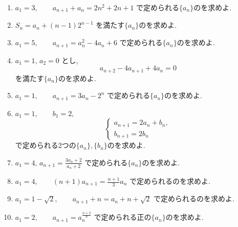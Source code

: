 \begin{enumerate}[label=\textbf{問\arabic*.},leftmargin=3.8em,format=\bookitemlink{practice-basic}{problem}{answer}]
          \item $\displaystyle a_1=3,\qquad a_{n+1}+a_n=2n^2+2n+1$
                で定められる$\{a_n\}$のを求めよ.
          \item $\displaystyle S_n=a_n+(n-1)2^{n-1}$
                                を満たす$\{a_n\}$のを求めよ.
          \item $\displaystyle a_1=5,\qquad a_{n+1}=a_n^2-4a_n+6$
                で定められる$\{a_n\}$のを求めよ.
          \item $\displaystyle a_1=1,\,a_2=0$ とし,
                \[
                  a_{n+2}-4a_{n+1}+4a_n=0
                \]
                を満たす$\{a_n\}$のを求めよ.
          \item $\displaystyle a_1=1,\qquad a_{n+1}=3a_n-2^n$
                で定められる$\{a_n\}$のを求めよ.
          \item $\displaystyle a_1=1,\qquad b_1=2,$
                            \[
                              \begin{cases}
                                a_{n+1}=2a_n+b_n,\\
                                b_{n+1}=2b_n
                              \end{cases}
                            \]
                                で定められる2つの$\{a_n\},\{b_n\}$のを求めよ.
          \item $\displaystyle a_1=4,\,a_{n+1}=\frac{3a_n+2}{a_n+2}$
                で定められる$\{a_n\}$のを求めよ.
          \item $\displaystyle a_1=4,\qquad (n+1)a_{n+1}=\frac{n+1}{3}a_n$
                で定められるのを求めよ.
          \item $\displaystyle a_1=1-\sqrt2,\qquad a_{n+1}+n=a_n+n+\sqrt2$
                で定められるのを求めよ.
          \item $\displaystyle a_1=2,\qquad a_{n+1}=a_n^{\frac{n+2}{n}}$
                で定められる正の$\{a_n\}$のを求めよ.

\end{enumerate}
